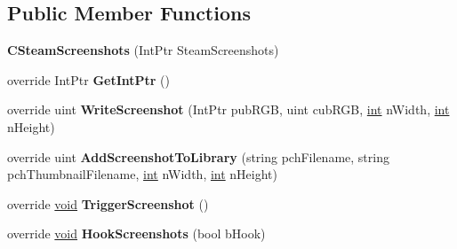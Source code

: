 \subsection*{Public Member Functions}
\begin{DoxyCompactItemize}
\item 
\hypertarget{classValve_1_1Steamworks_1_1CSteamScreenshots_a47e9aedb5c84613210e5e6bfce0d8914}{}{\bfseries C\+Steam\+Screenshots} (Int\+Ptr Steam\+Screenshots)\label{classValve_1_1Steamworks_1_1CSteamScreenshots_a47e9aedb5c84613210e5e6bfce0d8914}

\item 
\hypertarget{classValve_1_1Steamworks_1_1CSteamScreenshots_ab98e10425d223ea895a13e295e5208cc}{}override Int\+Ptr {\bfseries Get\+Int\+Ptr} ()\label{classValve_1_1Steamworks_1_1CSteamScreenshots_ab98e10425d223ea895a13e295e5208cc}

\item 
\hypertarget{classValve_1_1Steamworks_1_1CSteamScreenshots_a25bd500091551b277eff4d970d8e6ca8}{}override uint {\bfseries Write\+Screenshot} (Int\+Ptr pub\+R\+G\+B, uint cub\+R\+G\+B, \hyperlink{SDL__thread_8h_a6a64f9be4433e4de6e2f2f548cf3c08e}{int} n\+Width, \hyperlink{SDL__thread_8h_a6a64f9be4433e4de6e2f2f548cf3c08e}{int} n\+Height)\label{classValve_1_1Steamworks_1_1CSteamScreenshots_a25bd500091551b277eff4d970d8e6ca8}

\item 
\hypertarget{classValve_1_1Steamworks_1_1CSteamScreenshots_ac5827ff6ef6766cb46ffb7c7e60ae03e}{}override uint {\bfseries Add\+Screenshot\+To\+Library} (string pch\+Filename, string pch\+Thumbnail\+Filename, \hyperlink{SDL__thread_8h_a6a64f9be4433e4de6e2f2f548cf3c08e}{int} n\+Width, \hyperlink{SDL__thread_8h_a6a64f9be4433e4de6e2f2f548cf3c08e}{int} n\+Height)\label{classValve_1_1Steamworks_1_1CSteamScreenshots_ac5827ff6ef6766cb46ffb7c7e60ae03e}

\item 
\hypertarget{classValve_1_1Steamworks_1_1CSteamScreenshots_ad7f3cedcc9cab74c49d63079ca397b73}{}override \hyperlink{SDL__audio_8h_a52835ae37c4bb905b903cbaf5d04b05f}{void} {\bfseries Trigger\+Screenshot} ()\label{classValve_1_1Steamworks_1_1CSteamScreenshots_ad7f3cedcc9cab74c49d63079ca397b73}

\item 
\hypertarget{classValve_1_1Steamworks_1_1CSteamScreenshots_ada01627e52205937ee4385d9c6a93b8b}{}override \hyperlink{SDL__audio_8h_a52835ae37c4bb905b903cbaf5d04b05f}{void} {\bfseries Hook\+Screenshots} (bool b\+Hook)\label{classValve_1_1Steamworks_1_1CSteamScreenshots_ada01627e52205937ee4385d9c6a93b8b}


\end{DoxyCompactItemize}
